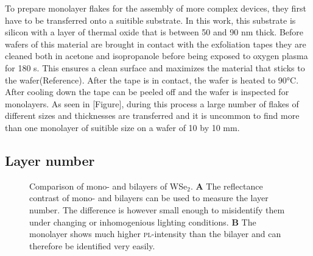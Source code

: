 To prepare monolayer flakes for the assembly of more complex devices, they first have to be transferred onto a suitible substrate. In this work, this substrate is silicon with a layer of thermal oxide that is between 50 and 90 nm thick. Before wafers of this material are brought in contact with the exfoliation tapes they are cleaned both in acetone and isopropanole before being exposed to oxygen plasma for 180 s. This ensures a clean surface and maximizes the material that sticks to the wafer(Reference). After the tape is in contact, the wafer is heated to 90°C. After cooling down the tape can be peeled off and the wafer is inspected for monolayers. As seen in [Figure], during this process a large number of flakes of different sizes and thicknesses are transferred and it is uncommon to find more than one monolayer of suitible size on a wafer of 10 by 10 mm. 

\subsection{Layer number}

\begin{figure}[h]
	\centering
	\begin{subfigure}{0.4\textwidth}
	\caption{}
	\end{subfigure}
	\begin{subfigure}{0.4\textwidth}
	\caption{}
	\end{subfigure}
	\caption{Comparison of mono- and bilayers of WSe$_2$. \textbf{A} The reflectance contrast of mono- and bilayers can be used to measure the layer number. The difference is however small enough to misidentify them under changing or inhomogenious lighting conditions. \textbf{B} The monolayer shows much higher \textsc{pl}-intensity than the bilayer and can therefore be identified very easily.}
	\label{pl-contrast}
\end{figure}

